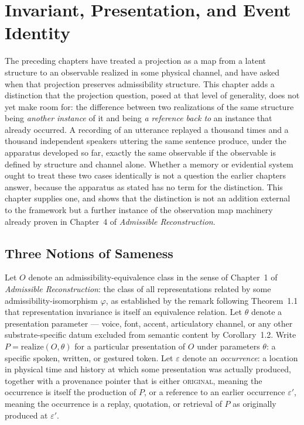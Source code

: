\chapter{Invariant, Presentation, and Event Identity}
\label{ch:essay-presentation-identity}

The preceding chapters have treated a projection as a map from a latent structure to an observable realized in some physical channel, and have asked when that projection preserves admissibility structure. This chapter adds a distinction that the projection question, posed at that level of generality, does not yet make room for: the difference between two realizations of the same structure being \emph{another instance} of it and being \emph{a reference back to} an instance that already occurred. A recording of an utterance replayed a thousand times and a thousand independent speakers uttering the same sentence produce, under the apparatus developed so far, exactly the same observable if the observable is defined by structure and channel alone. Whether a memory or evidential system ought to treat these two cases identically is not a question the earlier chapters answer, because the apparatus as stated has no term for the distinction. This chapter supplies one, and shows that the distinction is not an addition external to the framework but a further instance of the observation map machinery already proven in Chapter~4 of \emph{Admissible Reconstruction}.

\section{Three Notions of Sameness}

\begin{definition}
\label{def:presentation-identity}
Let $O$ denote an admissibility-equivalence class in the sense of Chapter~1 of \emph{Admissible Reconstruction}: the class of all representations related by some admissibility-isomorphism $\varphi$, as established by the remark following Theorem~1.1 that representation invariance is itself an equivalence relation. Let $\theta$ denote a presentation parameter --- voice, font, accent, articulatory channel, or any other substrate-specific datum excluded from semantic content by Corollary~1.2. Write $P = \mathrm{realize}(O, \theta)$ for a particular presentation of $O$ under parameters $\theta$: a specific spoken, written, or gestured token. Let $\varepsilon$ denote an \emph{occurrence}: a location in physical time and history at which some presentation was actually produced, together with a provenance pointer that is either \textsc{original}, meaning the occurrence is itself the production of $P$, or a reference to an earlier occurrence $\varepsilon'$, meaning the occurrence is a replay, quotation, or retrieval of $P$ as originally produced at $\varepsilon'$.
\end{definition}

